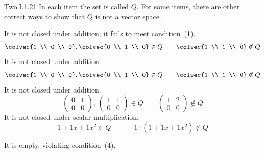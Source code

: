 \begin{ans}{Two.I.1.21}
      In each item the set is called \( Q \).
      For some items, there are other correct ways to show that $Q$ is not
      a vector space.
      \begin{exparts}
        \partsitem It is not closed under addition; it fails to meet
          condition~(1).
          \begin{equation*}
            \colvec{1 \\ 0 \\ 0},
            \colvec{0 \\ 1 \\ 0}\in Q
            \qquad
            \colvec{1 \\ 1 \\ 0}\not\in Q
          \end{equation*}
        \partsitem It is not closed under addition.
          \begin{equation*}
            \colvec{1 \\ 0 \\ 0},
            \colvec{0 \\ 1 \\ 0}\in Q
            \qquad
            \colvec{1 \\ 1 \\ 0}\not\in Q
          \end{equation*}
        \partsitem It is not closed under addition.
          \begin{equation*}
            \begin{pmatrix}
              0  &1  \\
              0  &0
            \end{pmatrix},
            \,
            \begin{pmatrix}
              1  &1  \\
              0  &0
            \end{pmatrix}\in Q
            \qquad
            \begin{pmatrix}
              1  &2  \\
              0  &0
            \end{pmatrix}\not\in Q
          \end{equation*}
        \partsitem It is not closed under scalar multiplication.
          \begin{equation*}
            1+1x+1x^2\in Q
            \qquad
            -1\cdot(1+1x+1x^2)\not\in Q
          \end{equation*}
        \item It is empty, violating condition~(4).
      \end{exparts}
    
\end{ans}
